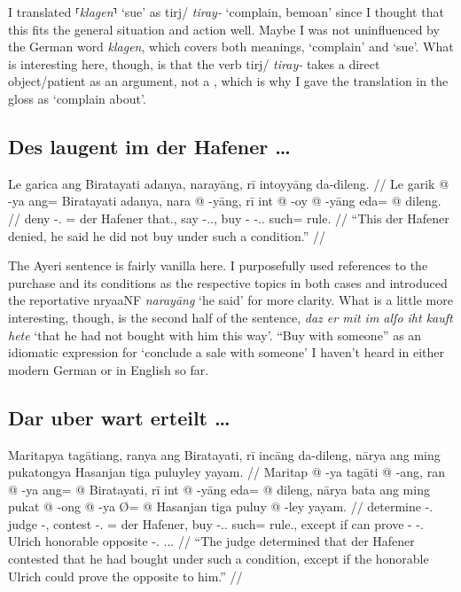 \documentclass[12pt,paper=a4]{scrartcl}
\newcommand{\fw}[1]{\textit{#1}} %
\newcommand{\norm}[1]{⸢\textit{#1}⸣} %
\newcommand{\ayr}[1]{{\Tagati #1}}
\newcommand{\xayr}[3]{{\Tagati #1} \emph{#2} \enquote*{#3}}
\begin{document}
I translated \norm{klagen} `sue' as \xayr{tirj/}{tiray-}{complain, bemoan} 
since I thought that this fits the general situation and action well. Maybe I 
was not uninfluenced by the German word \Nhg{} \fw{klagen}, which covers both 
meanings, `complain' and `sue'. What is interesting here, though, is that the 
verb \ayr{tirj/} \fw{tiray-} takes a direct object/patient \Np{} as an argument, 
not a \Pp{}, which is why I gave the translation in the gloss as `complain 
about'.

\subsection*{Des laugent im der Hafener …}


\ex
\begingl
	\glpreamble Le garica ang Biratayati adanya, narayāng, rī intoyyāng 
		da-dileng. //
	\gla Le garik @ -ya ang= Biratayati adanya, nara @ -yāng, rī int @ 
		-oy @ -yāng eda= @ dileng. //
	\glb \PatT{} deny -\Tsg{}.\M{} \Aarg{}= {der Hafener} that.\Top{}, say 
		-\Tsg{}.\M{}.\Aarg{}, \InsT{} buy -\Neg{} -\Tsg{}.\M{}.\Aarg{} 
		such= rule.\Top{} //
	\glft \enquote{This der Hafener denied, he said he did not buy under 
		such a condition.} //
\endgl \xe

The Ayeri sentence is fairly vanilla here. I purposefully used references to 
the purchase and its conditions as the respective topics in both cases and 
introduced the reportative \xayr{nryaaNF}{narayāng}{he said} for more clarity. 
What is a little more interesting, though, is the second half of the \Mhg{} 
sentence, \fw{daz er mit im alſo iht kauft hete} `that he had not bought with 
him this way'. \enquote{Buy with someone} as an idiomatic expression for 
`conclude a sale with someone' I haven't heard in either modern German or in 
English so far.

\subsection*{Dar uber wart erteilt …}


\ex \begingl
	\glpreamble Maritapya tagātiang, ranya ang Biratayati, rī incāng
		da-dileng, nārya ang ming pukatongya Hasanjan tiga puluyley 
		yayam. //
	\gla Maritap @ -ya tagāti @ -ang, ran @ -ya ang= @ Biratayati, rī
		int @ -yāng eda= @ dileng, nārya bata ang ming pukat @ -ong @ 
		-ya Ø= @ Hasanjan tiga puluy @ -ley yayam. //
	\glb determine -\Tsg{}.\M{} judge -\Aarg{}, contest -\Tsg{}.\M{}
		\Aarg{}= {der Hafener}, \InsT{} buy -\Tsg{}.\M{}.\Aarg{} such= 
		rule.\Top{}, except if \AgtT{} can prove -\Irr{} -\Tsg{}.\M{} 
		\Top{} Ulrich honorable opposite -\Parg{}.\Inan{} 
		\Tsg{}.\M{}.\Dat{}. //
	\glft \enquote{The judge determined that der Hafener contested that 
		he had bought under such a condition, except if the honorable 
		Ulrich could prove the opposite to him.} //
\endgl \xe
\end{document}
